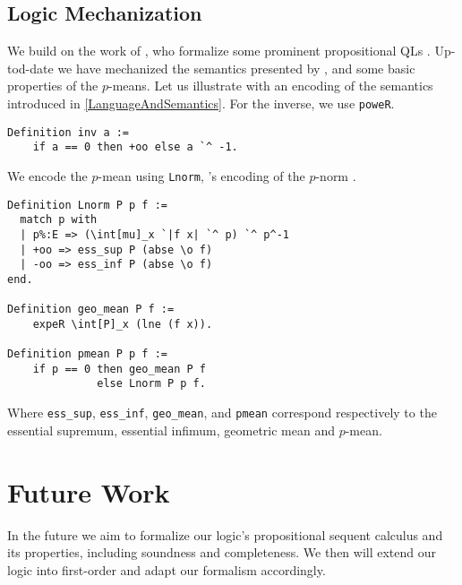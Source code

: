\documentclass[sigplan, screen, review, nonacm]{acmart}
\begin{document}
\subsection{Logic Mechanization}
We build on the work of \citeauthor{affeldt2024taming}, who formalize some prominent propositional QLs \citep{affeldt2024taming}.  Up-tod-date we have mechanized the semantics presented by \citeauthor{capucci2024quantifiers} \cite{capucci2024quantifiers}, and some basic properties of the $p$-means. Let us illustrate with an encoding of the semantics introduced in \cref{LanguageAndSemantics}. For the inverse, we use \texttt{poweR}.
\begin{verbatim}
Definition inv a := 
    if a == 0 then +oo else a `^ -1.
\end{verbatim}
We encode the $p$-mean using \texttt{Lnorm}, \mathcomp{}'s encoding of the $p$-norm \cite{lpspaces}. 
\begin{verbatim}
Definition Lnorm P p f :=
  match p with
  | p%:E => (\int[mu]_x `|f x| `^ p) `^ p^-1
  | +oo => ess_sup P (abse \o f)
  | -oo => ess_inf P (abse \o f)
end.

Definition geo_mean P f :=  
    expeR \int[P]_x (lne (f x)). 

Definition pmean P p f := 
    if p == 0 then geo_mean P f 
              else Lnorm P p f.
\end{verbatim}

Where \texttt{ess\_sup}, \texttt{ess\_inf},  \texttt{geo\_mean}, and \texttt{pmean} correspond respectively to the essential supremum, essential infimum, geometric mean and $p$-mean.

\section{Future Work}
 In the future we aim to formalize our logic's propositional sequent calculus and its properties, including soundness and completeness. We then will extend our logic into first-order and adapt our formalism accordingly.

\begin{comment}
\section{Acknowledgements}
J. Marulanda-Giraldo and E. Komendantskaya acknowledge the partial support of the EPSRC grant AISEC: AI Secure and Explainable by Construction (EP/T026960/1).
M. Capucci and E. Komendantskaya were supported by ARIA: Mathematics for Safe AI grant.
J. Marulanda-Giraldo received PhD Scholarship from the University of Southampton.
\end{comment}



\end{document}
